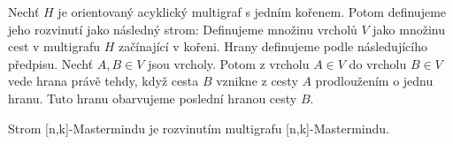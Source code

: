 \begin{definice}
    Nechť $H$ je orientovaný acyklický multigraf s jedním kořenem. 
    Potom definujeme jeho rozvinutí jako následný strom:
    Definujeme množinu vrcholů $V$ jako množinu cest v multigrafu $H$ začínající v kořeni. 
    Hrany definujeme podle následujícího předpisu. Nechť $A, B \in V$ jsou vrcholy. Potom z vrcholu $A \in V$ do vrcholu $B \in V$ vede hrana právě tehdy, když cesta $B$ vznikne z cesty $A$ prodloužením o jednu hranu. Tuto hranu obarvujeme poslední hranou cesty $B$. 
\end{definice}

\begin{veta}
    Strom [n,k]-Mastermindu je rozvinutím multigrafu [n,k]-Mastermindu.
\end{veta}




 





